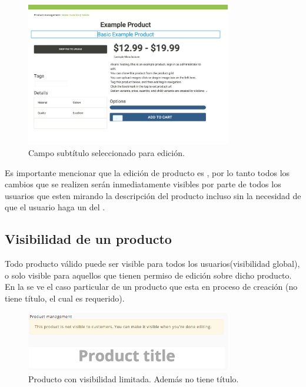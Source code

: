 		\begin{figure}[H]
			\centering
			\includegraphics[width=0.8\textwidth]{figuras/productos/interfaz_edicion_editando_subtitulo.png}

			\caption{Campo subtítulo seleccionado para edición.}
			\label{figure:features:interfaz_edicion_editando_subtitulo}
		\end{figure}

		Es importante mencionar que la edición de producto es \reactive, por lo tanto todos los cambios que se realizen serán inmediatamente visibles por parte de todos los usuarios que esten mirando la descripción del producto incluso sin la necesidad de que el usuario haga un  del \websiteINT.


	\subsection{Visibilidad de un producto}

		Todo producto válido puede ser visible para todos los usuarios(visibilidad global), o solo visible para aquellos que tienen permiso de edición sobre dicho producto. En la  se ve el caso particular de un producto que esta en proceso de creación (no tiene título, el cual es requerido).

		\begin{figure}[H]
			\centering
			\includegraphics[width=0.8\textwidth]{figuras/solution/product/visibility/new.png}

			\caption{Producto con visibilidad limitada. Además no tiene título.}
			\label{figure:solution:product:visibility:new}
		\end{figure}

